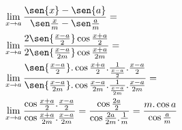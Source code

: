 \begin{ex}
\begin{align}
&\lim_{x\rightarrow a} \frac{\sen{x}-\sen{a}}{\sen\frac{x}{m}-\sen\frac{a}{m}}=\nonumber\\
&\lim_{x\rightarrow a} \frac{2\sen{\frac{x-a}{2}}\cos{\frac{x+a}{2}}}{2\sen{\frac{x-a}{2m}}\cos{\frac{x+a}{2m}}}=\nonumber\\
&\lim_{x\rightarrow a} \frac{\sen{\frac{x-a}{2}}.\cos{\frac{x+a}{2}}.\frac{1}{\frac{x-a}{2}}.\frac{x-a}{2}}{\sen{\frac{x-a}{2m}}.\cos{\frac{x-a}{2m}}.\frac{1}{\frac{x-a}{2m}}.\frac{x-a}{2m}}=\nonumber\\
&\lim_{x\rightarrow a} \frac{\cos{\frac{x+a}{2}}.\frac{x-a}{2}}{\cos{\frac{x+a}{2m}}.\frac{x-a}{2m}}=\frac{\cos{\frac{2a}{2}}}{\cos{\frac{2a}{2m}}.\frac{1}{m}}=\frac{m.\cos{a}}{\cos{\frac{a}{m}}}\nonumber
\end{align}
\end{ex}